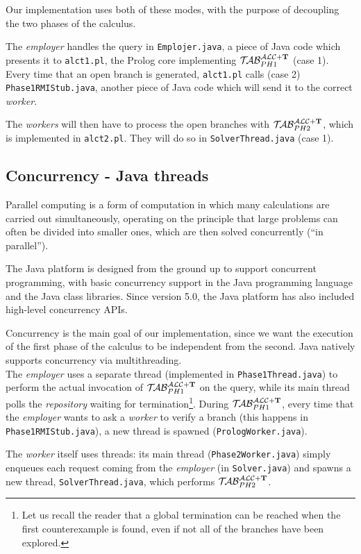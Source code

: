 \documentclass[a4paper, 11pt, oneside]{duthesis}
\newcommand{\tip}{{\bf T}}
\newcommand{\primo}{\mathrel{{\mathcal{T}\!\mathcal{AB}}}_{PH 1}^{\mathcal{ALC}+\mbox{\scriptsize $\tip$}}}
\newcommand{\secondo}{\mathrel{{\mathcal{T}\!\mathcal{AB}}}_{PH 2}^{\mathcal{ALC}+\mbox{\scriptsize $\tip$}}}
\begin{document}
Our implementation uses both of these modes, with the purpose of decoupling the two phases of the calculus.

The \emph{employer} handles the query in \verb$Emplojer.java$, a piece of Java code which presents it to \verb$alct1.pl$, the Prolog core implementing $\primo$ (case 1). Every time that an open branch is generated, \verb$alct1.pl$ calls (case 2) \verb$Phase1RMIStub.java$, another piece of Java code which will send it to the correct \emph{worker}.

The \emph{workers} will then have to process the open branches with $\secondo$, which is implemented in \verb$alct2.pl$. They will do so in \verb$SolverThread.java$ (case 1).


\subsection{Concurrency - Java threads}
Parallel computing is a form of computation in which many calculations are carried out simultaneously, operating on the principle that large problems can often be divided into smaller ones, which are then solved concurrently (``in parallel'')\cite{Almasi:1989:HPC:160438}.

The Java platform is designed from the ground up to support concurrent programming, with basic concurrency support in the Java programming language and the Java class libraries. Since version 5.0, the Java platform has also included high-level concurrency APIs\cite{oracle_thread}.

Concurrency is the main goal of our implementation, since we want the execution of the first phase of the calculus to be independent from the second. Java natively supports concurrency via multithreading.\\

The \emph{employer} uses a separate thread (implemented in \verb$Phase1Thread.java$) to perform the actual invocation of $\primo$ on the query, while its main thread polls the \emph{repository} waiting for termination\footnote{Let us recall the reader that a global termination can be reached when the first counterexample is found, even if not all of the branches have been explored.}.
During $\primo$, every time that the \emph{employer} wants to ask a \emph{worker} to verify a branch (this happens in \verb$Phase1RMIStub.java$), a new thread is spawned (\verb$PrologWorker.java$).

The \emph{worker} itself uses threads: its main thread (\verb$Phase2Worker.java$) simply enqueues each request coming from the \emph{employer} (in \verb$Solver.java$) and spawns a new thread, \verb$SolverThread.java$, which performs $\secondo$.
\end{document}
